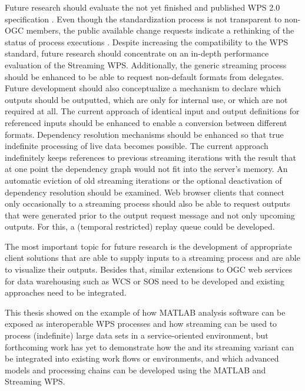 Future research should evaluate the not yet finished and published WPS 2.0 specification \citep{ogc:wps2swg}. Even though the standardization process is not transparent to non-OGC members, the public available change requests indicate a rethinking of the status of process executions \citep[e.g.][]{ogc:wps:cr109}. Despite increasing the compatibility to the WPS standard, future research should concentrate on an in-depth performance evaluation of the Streaming WPS. Additionally, the generic streaming process should be enhanced to be able to request non-default formats from delegates. Future development should also conceptualize a mechanism to declare which outputs should be outputted, which are only for internal use, or which are not required at all. The current approach of identical input and output definitions for referenced inputs should be enhanced to enable a conversion between different formats. Dependency resolution mechanisms should be enhanced so that true indefinite processing of live data becomes possible. The current approach indefinitely keeps references to previous streaming iterations with the result that at one point the dependency graph would not fit into the server's memory. An automatic eviction of old streaming iterations or the optional deactivation of dependency resolution should be examined. Web browser clients that connect only occasionally to a streaming process should also be able to request outputs that were generated prior to the output request message and not only upcoming outputs. For this, a (temporal restricted) replay queue could be developed.

The most important topic for future research is the development of appropriate client solutions that are able to supply inputs to a streaming process and are able to visualize their outputs. Besides that, similar extensions to OGC web services for data warehousing such as \ac{WCS} or \ac{SOS} need to be developed and existing approaches \citep[e.g. for the \ac{WFS}, see ][]{aydin2006streaming} need to be integrated.

This thesis showed on the example of \la how MATLAB analysis software can be exposed as interoperable WPS processes and how streaming can be used to process (indefinite) large data sets in a service-oriented environment, but forthcoming work has yet to demonstrate how the \la and its streaming variant can be integrated into existing work flows or environments, and which advanced models and processing chains can be developed using the MATLAB and Streaming WPS.
